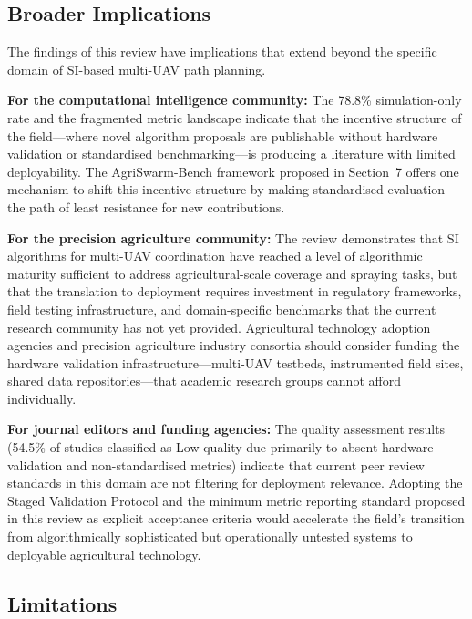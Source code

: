 \documentclass[review,3p,times]{elsarticle}
\begin{document}
\subsection{Broader Implications}

The findings of this review have implications that extend beyond the specific domain of SI-based multi-UAV path planning.

\textbf{For the computational intelligence community:} The 78.8\% simulation-only rate and the fragmented metric landscape indicate that the incentive structure of the field---where novel algorithm proposals are publishable without hardware validation or standardised benchmarking---is producing a literature with limited deployability. The AgriSwarm-Bench framework proposed in Section~7 offers one mechanism to shift this incentive structure by making standardised evaluation the path of least resistance for new contributions.

\textbf{For the precision agriculture community:} The review demonstrates that SI algorithms for multi-UAV coordination have reached a level of algorithmic maturity sufficient to address agricultural-scale coverage and spraying tasks, but that the translation to deployment requires investment in regulatory frameworks, field testing infrastructure, and domain-specific benchmarks that the current research community has not yet provided. Agricultural technology adoption agencies and precision agriculture industry consortia should consider funding the hardware validation infrastructure---multi-UAV testbeds, instrumented field sites, shared data repositories---that academic research groups cannot afford individually.

\textbf{For journal editors and funding agencies:} The quality assessment results (54.5\% of studies classified as Low quality due primarily to absent hardware validation and non-standardised metrics) indicate that current peer review standards in this domain are not filtering for deployment relevance. Adopting the Staged Validation Protocol and the minimum metric reporting standard proposed in this review as explicit acceptance criteria would accelerate the field's transition from algorithmically sophisticated but operationally untested systems to deployable agricultural technology.

\subsection{Limitations}
\label{sec:limitations}
\end{document}
